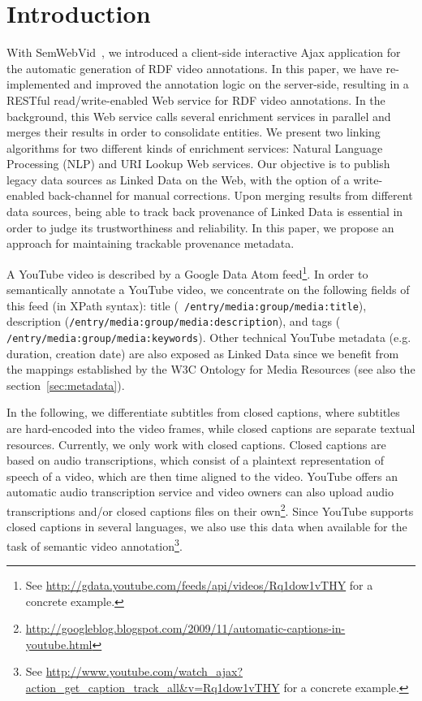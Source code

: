 \documentclass{acm_proc_article-sp}
\begin{document}


\section{Introduction}                                                      \label{sec:introduction}
With SemWebVid~\cite{Steiner:SemWebVid}, we introduced a client-side interactive Ajax application for the automatic
generation of RDF video annotations. In this paper, we have re-implemented and improved the annotation logic on the
server-side, resulting in a RESTful read/write-enabled Web service for RDF video annotations. In the background, this
Web service calls several enrichment services in parallel and merges their results in order to consolidate entities. We
present two linking algorithms for two different kinds of enrichment services: Natural Language Processing (NLP) and
URI Lookup Web services. Our objective is to publish legacy data sources as Linked Data on the Web, with the option of
a write-enabled back-channel for manual corrections. Upon merging results from different data sources, being able to
track back provenance of Linked Data is essential in order to judge its trustworthiness and reliability. In this paper,
we propose an approach for maintaining trackable provenance metadata.

A YouTube video is described by a Google Data Atom feed\footnote{See
\url{http://gdata.youtube.com/feeds/api/videos/Rq1dow1vTHY} for a concrete example.}. In order to semantically annotate
a YouTube video, we concentrate on the following fields of this feed (in XPath syntax): title ({\tt
/entry/media:group/media:title}), description ({\tt /entry/media:group/media:description}), and tags ({\tt
/entry/media:group/media:keywords}). Other technical YouTube metadata (e.g. duration, creation date) are also exposed
as Linked Data since we benefit from the mappings established by the W3C Ontology for Media Resources (see also the
section~\ref{sec:metadata}).

In the following, we differentiate subtitles from closed captions, where subtitles are hard-encoded into the video
frames, while closed captions are separate textual resources. Currently, we only work with closed captions. Closed
captions are based on audio transcriptions, which consist of a plaintext representation of speech of a video, which are
then time aligned to the video. YouTube offers an automatic audio transcription service and video owners can also
upload audio transcriptions and/or closed captions files on their
own\footnote{\url{http://googleblog.blogspot.com/2009/11/automatic-captions-in-youtube.html}}. Since YouTube supports
closed captions in several languages, we also use this data when available for the task of semantic video
annotation\footnote{See \url{http://www.youtube.com/watch_ajax?action_get_caption_track_all&v=Rq1dow1vTHY} for a
concrete example.}.
\end{document}
